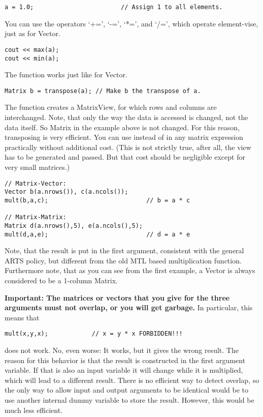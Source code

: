 \begin{verbatim}
a = 1.0;                        // Assign 1 to all elements.
\end{verbatim}


You can use the operators `+=', `-=', `*=', and `/=', which operate
element-vise, just as for Vector.

\begin{verbatim}
cout << max(a);
cout << min(a);
\end{verbatim}


The function  works just like for Vector.

\begin{verbatim}
Matrix b = transpose(a); // Make b the transpose of a.
\end{verbatim}

The function  creates a MatrixView, for which rows and
columns are interchanged. Note, that only the way the data is accessed
is changed, not the data itself. So Matrix  in the example
above is not changed. For this reason, transposing is very efficient.
You can use  instead of  in any matrix
expression practically without additional cost. (This is not strictly
true, after all, the view has to be generated and passed. But that
cost should be negligible except for very small matrices.)

\begin{verbatim}
// Matrix-Vector:
Vector b(a.nrows()), c(a.ncols());
mult(b,a,c);                           // b = a * c

// Matrix-Matrix:
Matrix d(a.nrows(),5), e(a.ncols(),5);
mult(d,a,e);                           // d = a * e
\end{verbatim}

Note, that the result is put in the first argument, consistent with
the general ARTS policy, but different from the old MTL based
multiplication function. Furthermore note, that as you can see from
the first example, a Vector is always considered to be a 1-column
Matrix.

\textbf{Important: The matrices or vectors that you give for the three
arguments must not overlap, or you will get garbage.} In particular,
this means that
\begin{verbatim}
mult(x,y,x);            // x = y * x FORBIDDEN!!!
\end{verbatim}
does not work. No, even worse: It works, but it gives the wrong
result.  The reason for this behavior is that the result is
constructed in the first argument variable. If that is also an input
variable it will change while it is multiplied, which will lead to a
different result.  There is no efficient way to detect overlap, so the
only way to allow input and output arguments to be identical would be
to use another internal dummy variable to store the result. However,
this would be much less efficient.

